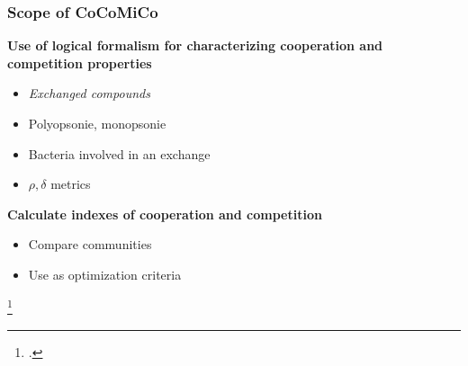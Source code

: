 \documentclass[8pt,usenames,dvipsnames]{beamer}
\begin{document}
\begin{frame}
\frametitle{Scope of CoCoMiCo}

\textbf{Use of logical formalism for characterizing cooperation and competition properties}
\begin{itemize}
\item \textit{Exchanged compounds}
\item Polyopsonie, monopsonie
\item Bacteria involved in an exchange
\item $\rho, \delta $ metrics  
\end{itemize}

\vspace{1cm}
\textbf{ Calculate indexes of cooperation and competition}
\begin{itemize}
\item Compare communities
\item Use as optimization criteria 
\end{itemize}


\footcite{Frioux2018}
\end{frame}
\end{document}
